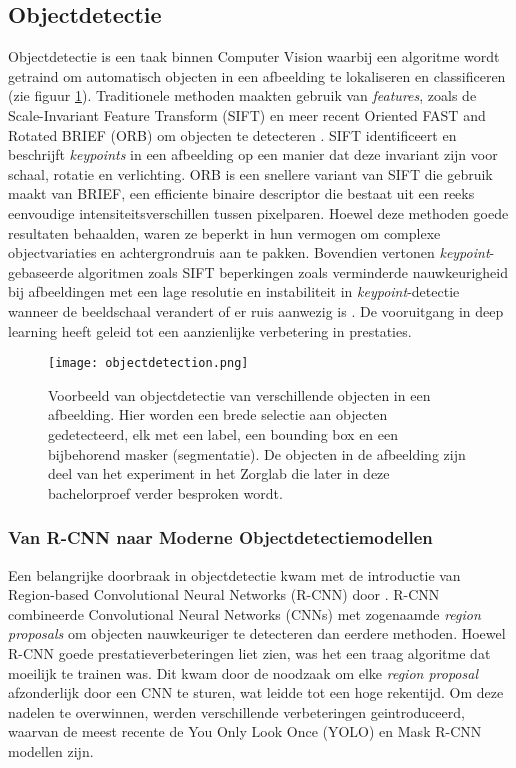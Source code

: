 \subsection{Objectdetectie}

Objectdetectie is een taak binnen Computer Vision waarbij een algoritme wordt getraind om automatisch objecten in een afbeelding te lokaliseren en classificeren (zie figuur \ref{fig:object-detection}).
Traditionele methoden maakten gebruik van \textit{features}, zoals de Scale-Invariant Feature Transform (SIFT) en meer recent Oriented FAST and Rotated BRIEF (ORB) om objecten te detecteren \autocite{Lindeberg2012, Rublee2011}.
SIFT identificeert en beschrijft \textit{keypoints} in een afbeelding op een manier dat deze invariant zijn voor schaal, rotatie en verlichting.
ORB is een snellere variant van SIFT die gebruik maakt van BRIEF, een efficiente binaire descriptor die bestaat uit een reeks eenvoudige intensiteitsverschillen tussen pixelparen.
Hoewel deze methoden goede resultaten behaalden, waren ze beperkt in hun vermogen om complexe objectvariaties en achtergrondruis aan te pakken. Bovendien vertonen \textit{keypoint}-gebaseerde algoritmen 
zoals SIFT beperkingen zoals verminderde nauwkeurigheid bij afbeeldingen met een lage resolutie en instabiliteit in \textit{keypoint}-detectie wanneer de beeldschaal verandert of er ruis aanwezig is \autocite{Ives2015}.
De vooruitgang in deep learning heeft geleid tot een aanzienlijke verbetering in prestaties.

\begin{figure}[H]
  \centering
  \texttt{[image: objectdetection.png]}
  \caption[]{\label{fig:object-detection}
  Voorbeeld van objectdetectie van verschillende objecten in een afbeelding. 
  Hier worden een brede selectie aan objecten gedetecteerd, elk met een label, een bounding box en een bijbehorend masker (segmentatie).
  De objecten in de afbeelding zijn deel van het experiment in het Zorglab die later in deze bachelorproef verder besproken wordt.
  }
\end{figure}

\subsubsection{Van R-CNN naar Moderne Objectdetectiemodellen}

Een belangrijke doorbraak in objectdetectie kwam met de introductie van Region-based Convolutional Neural Networks (R-CNN) door \textcite{Girshick2014}.
R-CNN combineerde Convolutional Neural Networks (CNNs) met zogenaamde \textit{region proposals} om objecten nauwkeuriger te detecteren dan eerdere methoden.
Hoewel R-CNN goede prestatieverbeteringen liet zien, was het een traag algoritme dat moeilijk te trainen was. 
Dit kwam door de noodzaak om elke \textit{region proposal} afzonderlijk door een CNN te sturen, wat leidde tot een hoge rekentijd.
Om deze nadelen te overwinnen, werden verschillende verbeteringen geintroduceerd, waarvan de meest recente de You Only Look Once (YOLO) en Mask R-CNN modellen zijn.

